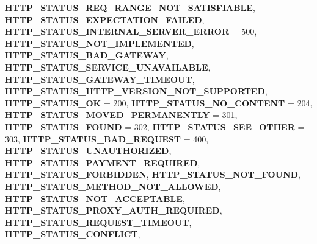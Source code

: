 \begin{DoxyCompactItemize}
{\bfseries H\+T\+T\+P\+\_\+\+S\+T\+A\+T\+U\+S\+\_\+\+R\+E\+Q\+\_\+\+R\+A\+N\+G\+E\+\_\+\+N\+O\+T\+\_\+\+S\+A\+T\+I\+S\+F\+I\+A\+B\+LE}, 
{\bfseries H\+T\+T\+P\+\_\+\+S\+T\+A\+T\+U\+S\+\_\+\+E\+X\+P\+E\+C\+T\+A\+T\+I\+O\+N\+\_\+\+F\+A\+I\+L\+ED}, 
\newline
{\bfseries H\+T\+T\+P\+\_\+\+S\+T\+A\+T\+U\+S\+\_\+\+I\+N\+T\+E\+R\+N\+A\+L\+\_\+\+S\+E\+R\+V\+E\+R\+\_\+\+E\+R\+R\+OR} = 500, 
{\bfseries H\+T\+T\+P\+\_\+\+S\+T\+A\+T\+U\+S\+\_\+\+N\+O\+T\+\_\+\+I\+M\+P\+L\+E\+M\+E\+N\+T\+ED}, 
{\bfseries H\+T\+T\+P\+\_\+\+S\+T\+A\+T\+U\+S\+\_\+\+B\+A\+D\+\_\+\+G\+A\+T\+E\+W\+AY}, 
{\bfseries H\+T\+T\+P\+\_\+\+S\+T\+A\+T\+U\+S\+\_\+\+S\+E\+R\+V\+I\+C\+E\+\_\+\+U\+N\+A\+V\+A\+I\+L\+A\+B\+LE}, 
\newline
{\bfseries H\+T\+T\+P\+\_\+\+S\+T\+A\+T\+U\+S\+\_\+\+G\+A\+T\+E\+W\+A\+Y\+\_\+\+T\+I\+M\+E\+O\+UT}, 
{\bfseries H\+T\+T\+P\+\_\+\+S\+T\+A\+T\+U\+S\+\_\+\+H\+T\+T\+P\+\_\+\+V\+E\+R\+S\+I\+O\+N\+\_\+\+N\+O\+T\+\_\+\+S\+U\+P\+P\+O\+R\+T\+ED}, 
{\bfseries H\+T\+T\+P\+\_\+\+S\+T\+A\+T\+U\+S\+\_\+\+OK} = 200, 
{\bfseries H\+T\+T\+P\+\_\+\+S\+T\+A\+T\+U\+S\+\_\+\+N\+O\+\_\+\+C\+O\+N\+T\+E\+NT} = 204, 
\newline
{\bfseries H\+T\+T\+P\+\_\+\+S\+T\+A\+T\+U\+S\+\_\+\+M\+O\+V\+E\+D\+\_\+\+P\+E\+R\+M\+A\+N\+E\+N\+T\+LY} = 301, 
{\bfseries H\+T\+T\+P\+\_\+\+S\+T\+A\+T\+U\+S\+\_\+\+F\+O\+U\+ND} = 302, 
{\bfseries H\+T\+T\+P\+\_\+\+S\+T\+A\+T\+U\+S\+\_\+\+S\+E\+E\+\_\+\+O\+T\+H\+ER} = 303, 
{\bfseries H\+T\+T\+P\+\_\+\+S\+T\+A\+T\+U\+S\+\_\+\+B\+A\+D\+\_\+\+R\+E\+Q\+U\+E\+ST} = 400, 
\newline
{\bfseries H\+T\+T\+P\+\_\+\+S\+T\+A\+T\+U\+S\+\_\+\+U\+N\+A\+U\+T\+H\+O\+R\+I\+Z\+ED}, 
{\bfseries H\+T\+T\+P\+\_\+\+S\+T\+A\+T\+U\+S\+\_\+\+P\+A\+Y\+M\+E\+N\+T\+\_\+\+R\+E\+Q\+U\+I\+R\+ED}, 
{\bfseries H\+T\+T\+P\+\_\+\+S\+T\+A\+T\+U\+S\+\_\+\+F\+O\+R\+B\+I\+D\+D\+EN}, 
{\bfseries H\+T\+T\+P\+\_\+\+S\+T\+A\+T\+U\+S\+\_\+\+N\+O\+T\+\_\+\+F\+O\+U\+ND}, 
\newline
{\bfseries H\+T\+T\+P\+\_\+\+S\+T\+A\+T\+U\+S\+\_\+\+M\+E\+T\+H\+O\+D\+\_\+\+N\+O\+T\+\_\+\+A\+L\+L\+O\+W\+ED}, 
{\bfseries H\+T\+T\+P\+\_\+\+S\+T\+A\+T\+U\+S\+\_\+\+N\+O\+T\+\_\+\+A\+C\+C\+E\+P\+T\+A\+B\+LE}, 
{\bfseries H\+T\+T\+P\+\_\+\+S\+T\+A\+T\+U\+S\+\_\+\+P\+R\+O\+X\+Y\+\_\+\+A\+U\+T\+H\+\_\+\+R\+E\+Q\+U\+I\+R\+ED}, 
{\bfseries H\+T\+T\+P\+\_\+\+S\+T\+A\+T\+U\+S\+\_\+\+R\+E\+Q\+U\+E\+S\+T\+\_\+\+T\+I\+M\+E\+O\+UT}, 
\newline
{\bfseries H\+T\+T\+P\+\_\+\+S\+T\+A\+T\+U\+S\+\_\+\+C\+O\+N\+F\+L\+I\+CT}, 

\end{DoxyCompactItemize}
